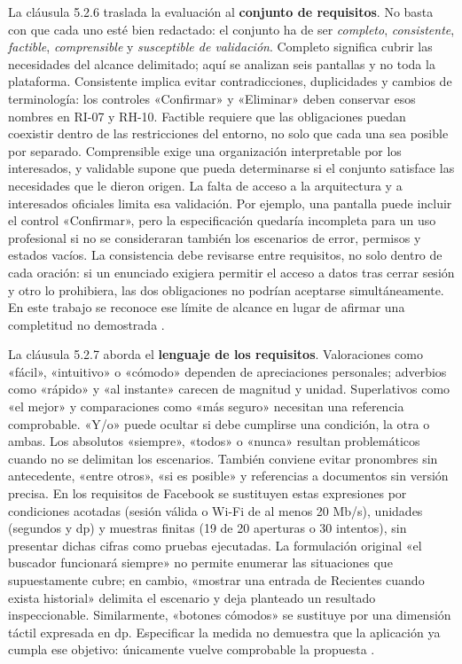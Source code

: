 \documentclass[11pt,a4paper]{article}
\begin{document}
La cláusula 5.2.6 traslada la evaluación al \textbf{conjunto de requisitos}. No basta con que cada uno esté bien redactado: el conjunto ha de ser \emph{completo}, \emph{consistente}, \emph{factible}, \emph{comprensible} y \emph{susceptible de validación}. Completo significa cubrir las necesidades del alcance delimitado; aquí se analizan seis pantallas y no toda la plataforma. Consistente implica evitar contradicciones, duplicidades y cambios de terminología: los controles «Confirmar» y «Eliminar» deben conservar esos nombres en RI-07 y RH-10. Factible requiere que las obligaciones puedan coexistir dentro de las restricciones del entorno, no solo que cada una sea posible por separado. Comprensible exige una organización interpretable por los interesados, y validable supone que pueda determinarse si el conjunto satisface las necesidades que le dieron origen. La falta de acceso a la arquitectura y a interesados oficiales limita esa validación. Por ejemplo, una pantalla puede incluir el control «Confirmar», pero la especificación quedaría incompleta para un uso profesional si no se consideraran también los escenarios de error, permisos y estados vacíos. La consistencia debe revisarse entre requisitos, no solo dentro de cada oración: si un enunciado exigiera permitir el acceso a datos tras cerrar sesión y otro lo prohibiera, las dos obligaciones no podrían aceptarse simultáneamente. En este trabajo se reconoce ese límite de alcance en lugar de afirmar una completitud no demostrada \cite{ISO29148}.

La cláusula 5.2.7 aborda el \textbf{lenguaje de los requisitos}. Valoraciones como «fácil», «intuitivo» o «cómodo» dependen de apreciaciones personales; adverbios como «rápido» y «al instante» carecen de magnitud y unidad. Superlativos como «el mejor» y comparaciones como «más seguro» necesitan una referencia comprobable. «Y/o» puede ocultar si debe cumplirse una condición, la otra o ambas. Los absolutos «siempre», «todos» o «nunca» resultan problemáticos cuando no se delimitan los escenarios. También conviene evitar pronombres sin antecedente, «entre otros», «si es posible» y referencias a documentos sin versión precisa. En los requisitos de Facebook se sustituyen estas expresiones por condiciones acotadas (sesión válida o Wi-Fi de al menos 20 Mb/s), unidades (segundos y dp) y muestras finitas (19 de 20 aperturas o 30 intentos), sin presentar dichas cifras como pruebas ejecutadas. La formulación original «el buscador funcionará siempre» no permite enumerar las situaciones que supuestamente cubre; en cambio, «mostrar una entrada de Recientes cuando exista historial» delimita el escenario y deja planteado un resultado inspeccionable. Similarmente, «botones cómodos» se sustituye por una dimensión táctil expresada en dp. Especificar la medida no demuestra que la aplicación ya cumpla ese objetivo: únicamente vuelve comprobable la propuesta \cite{ISO29148}.
\end{document}
